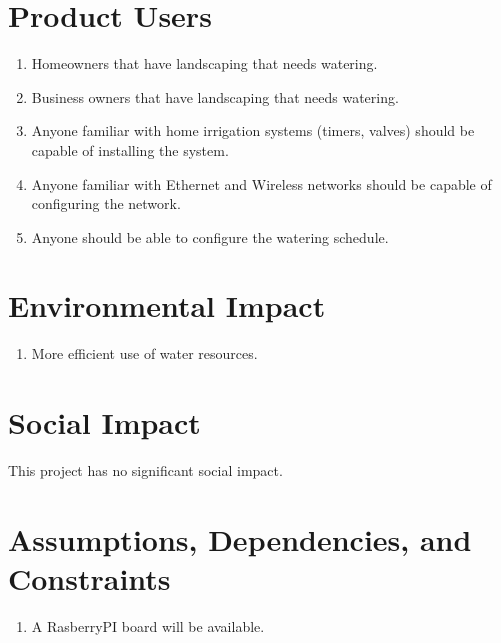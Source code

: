 \documentclass[12pt,letterpaper]{article}
\begin{document}

\pagebreak

\section{Product Users}

\begin{enumerate}
\item Homeowners that have landscaping that needs watering.
\item Business owners that have landscaping that needs watering.
\item Anyone familiar with home irrigation systems (timers, valves)
should be capable of installing the system.
\item Anyone familiar with Ethernet and Wireless networks should
	be capable of configuring the network.
\item Anyone should be able to configure the watering schedule.
\end{enumerate}


\section{Environmental Impact}

\begin{enumerate}
\item More efficient use of water resources.
\end{enumerate}

\section{Social Impact}

This project has no significant social impact.


\section{Assumptions, Dependencies, and Constraints}

\begin{enumerate}
\item A RasberryPI board will be available.
\end{enumerate}

\end{document}
